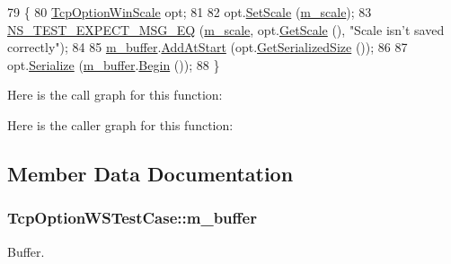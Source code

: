 \begin{DoxyCode}
79 \{
80   \hyperlink{classns3_1_1TcpOptionWinScale}{TcpOptionWinScale} opt;
81 
82   opt.\hyperlink{classns3_1_1TcpOptionWinScale_a726c4215fdc53f31584bee662c9d39b0}{SetScale} (\hyperlink{classTcpOptionWSTestCase_a4847a798c3330400decfb801a8ef1c77}{m\_scale});
83   \hyperlink{group__testing_ga7304ba46a28d8cf08dfdfd6499cf7068}{NS\_TEST\_EXPECT\_MSG\_EQ} (\hyperlink{classTcpOptionWSTestCase_a4847a798c3330400decfb801a8ef1c77}{m\_scale}, opt.\hyperlink{classns3_1_1TcpOptionWinScale_a53c0df5957a2497da716830f6e190b8e}{GetScale} (), \textcolor{stringliteral}{"Scale isn't saved
       correctly"});
84 
85   \hyperlink{classTcpOptionWSTestCase_aa48ab929574ccf615d204293f3875e02}{m\_buffer}.\hyperlink{classns3_1_1Buffer_a8abd8164c3671d3dadc98fc66fade7b1}{AddAtStart} (opt.\hyperlink{classns3_1_1TcpOptionWinScale_a4d4282ca4e8c29926b7ab2802bb6a13a}{GetSerializedSize} ());
86 
87   opt.\hyperlink{classns3_1_1TcpOptionWinScale_ac0cc4f3dfef1d0d7e03725fc83acd3b0}{Serialize} (\hyperlink{classTcpOptionWSTestCase_aa48ab929574ccf615d204293f3875e02}{m\_buffer}.\hyperlink{classns3_1_1Buffer_a893d4bf50df13e730b6cd0fda91b967f}{Begin} ());
88 \}
\end{DoxyCode}


Here is the call graph for this function\+:




Here is the caller graph for this function\+:




\subsection{Member Data Documentation}
\subsubsection[{\texorpdfstring{m\+\_\+buffer}{m_buffer}}]{ Tcp\+Option\+W\+S\+Test\+Case\+::m\+\_\+buffer\hspace{0.3cm}{\ttfamily [private]}}\hypertarget{classTcpOptionWSTestCase_aa48ab929574ccf615d204293f3875e02}{}\label{classTcpOptionWSTestCase_aa48ab929574ccf615d204293f3875e02}


Buffer. 

